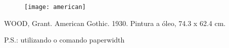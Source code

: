 \documentclass[				
a4paper,						
12pt,
brazil]{abntex2}
\begin{document}
	
\begin{figure}
\begin{center}
	\texttt{[image: american]}
\end{center}
\end{figure}

\begin{center}
	\small {WOOD, Grant. American Gothic. 1930. Pintura a óleo, 74.3 x 62.4 cm.}
\end{center}

	\scriptsize {P.S.: utilizando o comando paperwidth}
\end{document}
